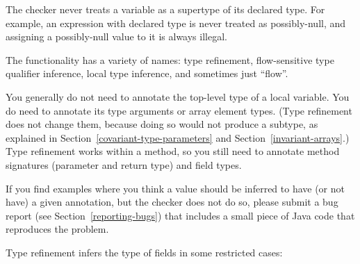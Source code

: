 The checker never treats a variable as
a supertype of its declared type.  For example, an expression with declared type 
is never treated as possibly-null, and assigning a possibly-null value to it is always illegal.

The functionality has a variety of names:  type refinement,
flow-sensitive type qualifier inference, local type inference, and
sometimes just ``flow''.



You generally do not need to annotate the top-level type of a local variable.
You do need to annotate its type arguments or array element types.
(Type refinement does not change them, because doing so would not produce a
subtype, as explained in Section~\ref{covariant-type-parameters} and
Section~\ref{invariant-arrays}.)
Type refinement works within a method, so you still need to
annotate method signatures (parameter and return type) and field types.

If you find examples where you think a value should be inferred to have
(or not have) a
given annotation, but the checker does not do so, please submit a bug
report (see Section~\ref{reporting-bugs}) that includes a small piece of
Java code that reproduces the problem.



Type refinement infers the type of fields in some restricted cases:


